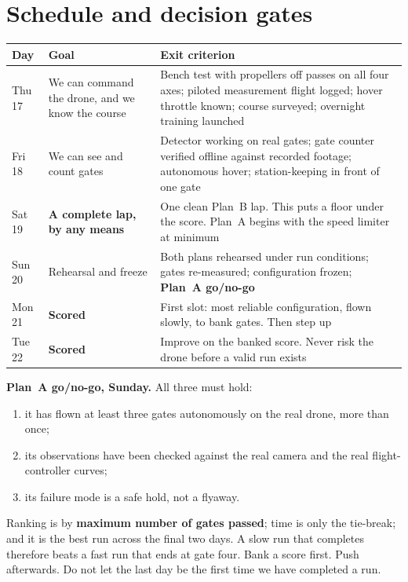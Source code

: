 \section{Schedule and decision gates}\label{sec:schedule}

\begin{table}[H]\centering\footnotesize
\begin{tabularx}{\linewidth}{@{}p{1.5cm} p{3.2cm} X@{}}
\toprule
Day & Goal & Exit criterion \\
\midrule
Thu 17 & We can command the drone, and we know the course & Bench test with propellers off passes on all four axes; piloted measurement flight logged; hover throttle known; course surveyed; overnight training launched \\
Fri 18 & We can see and count gates & Detector working on real gates; gate counter verified offline against recorded footage; autonomous hover; station-keeping in front of one gate \\
Sat 19 & \textbf{A complete lap, by any means} & One clean Plan~B lap. This puts a floor under the score. Plan~A begins with the speed limiter at minimum \\
Sun 20 & Rehearsal and freeze & Both plans rehearsed under run conditions; gates re-measured; configuration frozen; \textbf{Plan~A go/no-go} \\
Mon 21 & \textbf{Scored} & First slot: most reliable configuration, flown slowly, to bank gates. Then step up \\
Tue 22 & \textbf{Scored} & Improve on the banked score. Never risk the drone before a valid run exists \\
\bottomrule
\end{tabularx}
\end{table}

\textbf{Plan~A go/no-go, Sunday.} All three must hold:
\begin{enumerate}
\item it has flown at least three gates autonomously on the real drone, more than once;
\item its observations have been checked against the real camera and the real flight-controller
curves;
\item its failure mode is a safe hold, not a flyaway.
\end{enumerate}

\begin{warnbox}
Ranking is by \textbf{maximum number of gates passed}; time is only the tie-break; and it is the best
run across the final two days. A slow run that completes therefore beats a fast run that ends at gate
four. Bank a score first. Push afterwards. Do not let the last day be the first time we have completed
a run.
\end{warnbox}

